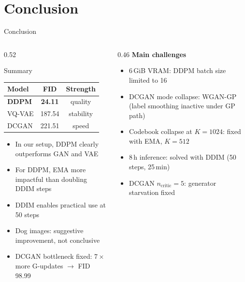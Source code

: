 \documentclass[aspectratio=169,10pt]{beamer}
\begin{document}
\section{Conclusion}
%
\begin{frame}[shrink=8]{Conclusion}
\small
  \begin{columns}[T]
    \begin{column}{0.52\textwidth}
      \begin{block}{Summary}
        \centering\vspace{3pt}
        \begin{tabular}{lcc}
          \toprule
          Model & FID & Strength \\
          \midrule
          \textbf{DDPM} & \textbf{24.11} & quality \\
          VQ-VAE        & 187.54 & stability \\
          DCGAN         & 221.51 & speed \\
          \bottomrule
        \end{tabular}\vspace{3pt}
      \end{block}
      \vspace{5pt}
      \begin{itemize}
        \item In our setup, DDPM clearly outperforms GAN and VAE
        \item For DDPM, EMA more impactful than doubling DDIM steps
        \item DDIM enables practical use at 50 steps
        \item Dog images: suggestive improvement, not conclusive
        \item DCGAN bottleneck fixed: $7\times$ more G-updates $\to$ FID 98.99
      \end{itemize}
    \end{column}
    \begin{column}{0.46\textwidth}
      \textbf{Main challenges}
      \begin{itemize}
        \item 6\,GiB VRAM: DDPM batch size limited to 16
        \item DCGAN mode collapse: WGAN-GP (label smoothing inactive under GP path)
        \item Codebook collapse at $K=1024$: fixed with EMA, $K=512$
        \item 8\,h inference: solved with DDIM (50 steps, 25\,min)
        \item DCGAN $n_\text{critic}=5$: generator starvation fixed

\end{itemize}
\end{column}
\end{columns}
\end{frame}
\end{document}

